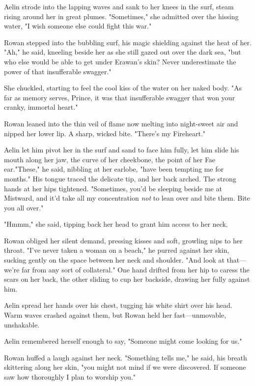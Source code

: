 Aelin strode into the lapping waves and sank to her knees in the surf, steam rising around her in great plumes.
"Sometimes," she admitted over the hissing water, "I wish someone else could fight this war."

Rowan stepped into the bubbling surf, his magic shielding against the heat of her.
"Ah," he said, kneeling beside her as she still gazed out over the dark sea, "but who else would be able to get under Erawan's skin?
Never underestimate the power of that insufferable swagger."

She chuckled, starting to feel the cool kiss of the water on her naked body.
"As far as memory serves, Prince, it was that insufferable swagger that won your cranky, immortal heart."

Rowan leaned into the thin veil of flame now melting into night-sweet air and nipped her lower lip.
A sharp, wicked bite.
"There's my Fireheart."

Aelin let him pivot her in the surf and sand to face him fully, let him slide his mouth along her jaw, the curve of her cheekbone, the point of her Fae ear."These," he said, nibbling at her earlobe, "have been tempting me for months."
His tongue traced the delicate tip, and her back arched.
The strong hands at her hips tightened.
"Sometimes, you'd be sleeping beside me at Mistward, and it'd take all my concentration \emph{not} to lean over and bite them.
Bite you all over."

"Hmmm," she said, tipping back her head to grant him access to her neck.

Rowan obliged her silent demand, pressing kisses and soft, growling nips to her throat.
"I've never taken a woman on a beach," he purred against her skin, sucking gently on the space between her neck and shoulder.
"And look at that--- we're far from any sort of 
collateral."
One hand drifted from her hip to caress the scars on her back, the other sliding to cup her backside, drawing her fully against him.

Aelin spread her hands over his chest, tugging his white shirt over his head.
Warm waves crashed against them, but Rowan held her fast---unmovable, unshakable.

Aelin remembered herself enough to say, "Someone might come looking for us."

Rowan huffed a laugh against her neck.
"Something tells me," he said, his breath skittering along her skin, "you might not mind if we were discovered.
If someone saw how thoroughly I plan to worship you."


